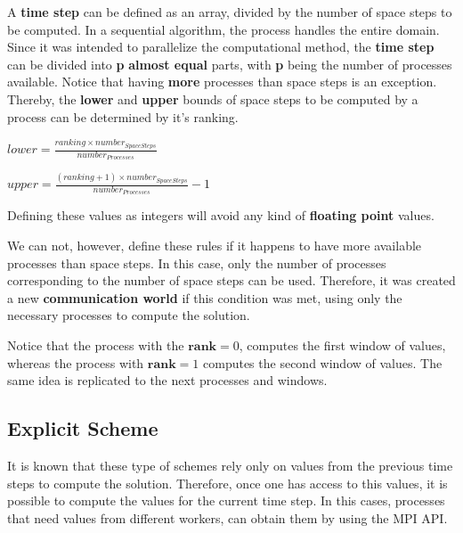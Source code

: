 \documentclass[12pt]{article}
\begin{document}
\par A \textbf{time step} can be defined as an array, divided by the number of space steps to be computed. In a sequential algorithm, the process handles the entire domain. Since it was intended to parallelize the computational method, the \textbf{time step} can be divided into \textbf{p} \textbf{almost equal} parts, with \textbf{p} being the number of processes available. Notice that having \textbf{more} processes than space steps is an exception. Thereby, the \textbf{lower} and \textbf{upper} bounds of space steps to be computed by a process can be determined by it's ranking.
\newline
\begin{center}
\large
\begin{minipage}{.5\textwidth}
  \centering
  $
  	lower = \frac{ranking \times number_{Space Steps} }{number_{Processes}}
  $
\end{minipage}%
\begin{minipage}{.5\textwidth}
  \centering
  $
  	upper = \frac{ (ranking + 1) \times number_{Space Steps} }{number_{Processes}} - 1
  $
\end{minipage}
\end{center}
\hfill
\par Defining these values as integers will avoid any kind of \textbf{floating point} values.
\par We can not, however, define these rules if it happens to have more available processes than space steps. In this case, only the number of processes corresponding to the number of space steps can be used. Therefore, it was created a new \textbf{communication world} if this condition was met, using only the necessary processes to compute the solution.
\par Notice that the process with the $\textbf{rank} = 0$, computes the first window of values, whereas the process with $\textbf{rank} = 1$ computes the second window of values. The same idea is replicated to the next processes and windows.

\subsection*{Explicit Scheme}

\par It is known that these type of schemes rely only on values from the previous time steps to compute the solution\cite{fraga}. Therefore, once one has access to this values, it is possible to compute the values for the current time step. In this cases, processes that need values from different workers, can obtain them by using the MPI API.
\end{document}
